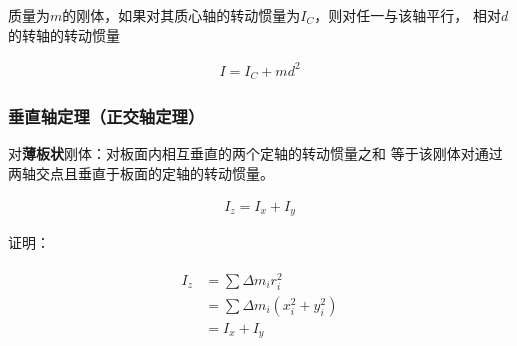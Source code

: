 \documentclass[12pt, a4paper]{article}
\numberwithin{equation}{section}
\begin{document}
    质量为\(m\)的刚体，如果对其质心轴的转动惯量为\(I_{C}\)，则对任一与该轴平行，
    相对\(d\)的转轴的转动惯量

    \begin{align}
        I = I_{C} + md^2
    \end{align}

\subsubsection{垂直轴定理（正交轴定理）}

    对\textbf{薄板状}刚体：对板面内相互垂直的两个定轴的转动惯量之和
    等于该刚体对通过两轴交点且垂直于板面的定轴的转动惯量。

    \begin{align}
        I_{z} = I_{x} + I_{y}
    \end{align}

    证明：

    \begin{align*}
        \begin{aligned}
            I_{z} &= \sum \Delta m_{i}r_{i}^2 \\
            &= \sum \Delta m_{i}\left(x_{i}^2 + y_{i}^2\right) \\
            &= I_{x} + I_{y}
        \end{aligned}
    \end{align*}
\end{document}
